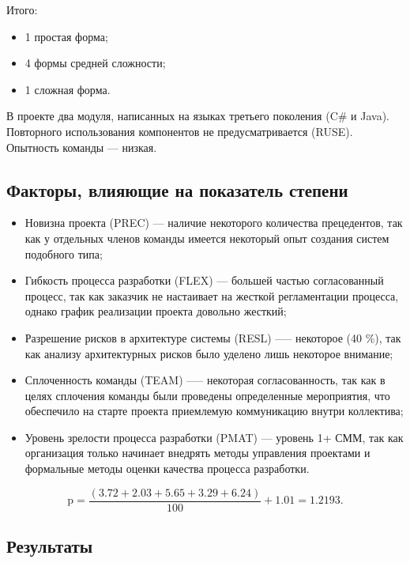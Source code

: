 \documentclass{bmstu}
\begin{document}
Итого:

\begin{itemize}
    \item 1 простая форма;
    \item 4 формы средней сложности;
    \item 1 сложная форма.
\end{itemize}

В проекте два модуля, написанных на языках третьего поколения (C\# и Java). Повторного использования компонентов не предусматривается (RUSE). Опытность команды --- низкая.

\subsection*{Факторы, влияющие на показатель степени}

\begin{itemize}
    \item Новизна проекта (PREC) --- наличие некоторого количества прецедентов, так как у отдельных членов команды имеется некоторый опыт создания систем подобного типа;
    \item Гибкость процесса разработки (FLEX) --- большей частью согласованный процесс, так как заказчик не настаивает на жесткой регламентации процесса, однако график реализации проекта довольно жесткий;
    \item Разрешение рисков в архитектуре системы (RESL) —-- некоторое (40 \%), так как анализу архитектурных рисков было уделено лишь некоторое внимание;
    \item Сплоченность команды (TEAM) —-- некоторая согласованность, так как в целях сплочения команды были проведены определенные мероприятия, что обеспечило на старте проекта приемлемую коммуникацию внутри коллектива;
    \item Уровень зрелости процесса разработки (PMAT) --- уровень 1+ СММ, так как организация только начинает внедрять методы управления проектами и формальные методы оценки качества процесса разработки.
\end{itemize}


\begin{equation}
    \text{p} = \frac{(3.72 + 2.03 + 5.65 + 3.29 + 6.24)}{100} + 1.01 = 1.2193.
\end{equation}

\clearpage

\subsection*{Результаты}
\end{document}

